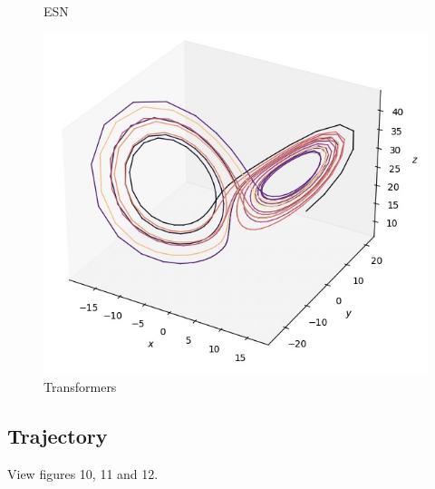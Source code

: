 \documentclass[11pt]{article}
\begin{document}
\begin{figure}[ht]
\begin{minipage}{0.32\textwidth}
        \caption{ESN}
    \end{minipage}\hfill
    \begin{minipage}{0.32\textwidth}
        \centering
        \includegraphics[width=\textwidth]{transformers_lorenz.jpeg}
        \caption{Transformers}
    \end{minipage}
\end{figure}

\subsection{Trajectory}
View figures 10, 11 and 12.
\end{document}
